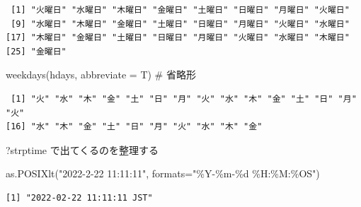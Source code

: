 \documentclass[
  letterpaper,
  DIV=11,
  numbers=noendperiod]{scrreprt}
\newenvironment{Shaded}{\begin{snugshade}}{\end{snugshade}}
\newcommand{\AttributeTok}[1]{\textcolor[rgb]{0.40,0.45,0.13}{#1}}
\newcommand{\CommentTok}[1]{\textcolor[rgb]{0.37,0.37,0.37}{#1}}
\newcommand{\FunctionTok}[1]{\textcolor[rgb]{0.28,0.35,0.67}{#1}}
\newcommand{\NormalTok}[1]{\textcolor[rgb]{0.00,0.23,0.31}{#1}}
\newcommand{\StringTok}[1]{\textcolor[rgb]{0.13,0.47,0.30}{#1}}
\begin{document}
\begin{verbatim}
 [1] "火曜日" "水曜日" "木曜日" "金曜日" "土曜日" "日曜日" "月曜日" "火曜日"
 [9] "水曜日" "木曜日" "金曜日" "土曜日" "日曜日" "月曜日" "火曜日" "水曜日"
[17] "木曜日" "金曜日" "土曜日" "日曜日" "月曜日" "火曜日" "水曜日" "木曜日"
[25] "金曜日"
\end{verbatim}

\begin{Shaded}
\begin{Highlighting}[]
\FunctionTok{weekdays}\NormalTok{(hdays, }\AttributeTok{abbreviate =}\NormalTok{ T) }\CommentTok{\# 省略形}
\end{Highlighting}
\end{Shaded}

\begin{verbatim}
 [1] "火" "水" "木" "金" "土" "日" "月" "火" "水" "木" "金" "土" "日" "月" "火"
[16] "水" "木" "金" "土" "日" "月" "火" "水" "木" "金"
\end{verbatim}

?strptime で出てくるのを整理する

\begin{Shaded}
\begin{Highlighting}[]
\FunctionTok{as.POSIXlt}\NormalTok{(}\StringTok{"2022{-}2{-}22 11:11:11"}\NormalTok{, }\AttributeTok{formats=}\StringTok{"\%Y{-}\%m{-}\%d \%H:\%M:\%OS"}\NormalTok{)}
\end{Highlighting}
\end{Shaded}

\begin{verbatim}
[1] "2022-02-22 11:11:11 JST"
\end{verbatim}
\end{document}
